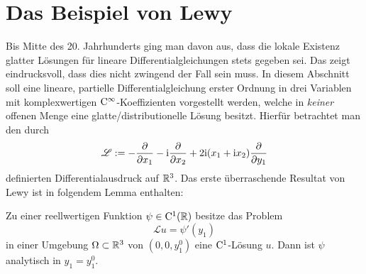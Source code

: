 

\section{Das Beispiel von Lewy}


Bis Mitte des 20. Jahrhunderts ging man davon aus, dass die lokale Existenz glatter Lösungen für lineare Differentialgleichungen stets gegeben sei. Das  zeigt eindrucksvoll, dass dies nicht zwingend der Fall sein muss.  In diesem Abschnitt soll eine lineare, partielle Differentialgleichung erster Ordnung in drei Variablen mit komplexwertigen $\mathrm C^\infty$-Koeffizienten vorgestellt werden, welche in \emph{keiner} offenen Menge eine glatte/distributionelle Lösung besitzt. Hierfür betrachtet man den durch
\begin{equation}\label{lewy:differentialausdruck}
\mathscr L := -\frac{\partial}{\partial x_1} -\mathrm i\frac{\partial}{\partial x_2} +2\mathrm i(x_1+\mathrm i x_2)\frac{\partial}{\partial y_1}
\end{equation}
definierten Differentialausdruck auf $\mathbb R^3$. Das erste überraschende Resultat von Lewy ist in folgendem Lemma enthalten:
\begin{lem}\label{thm:1_lewy}
Zu einer reellwertigen Funktion $\psi\in \mathrm C^1(\mathbb{R})$ besitze das Problem
\begin{equation}\label{eq:1_lewy:gleichung}
\mathscr Lu=\psi'(y_1)
\end{equation}
in einer Umgebung $\Omega\subset\mathbb R^3$ von $(0,0,y_1^0)$ eine $\mathrm C^1$-Lösung $u$. Dann ist $\psi$ analytisch in $y_1=y_1^0$.
\end{lem}

